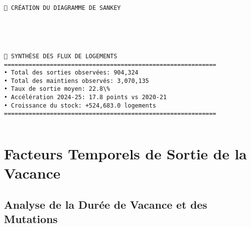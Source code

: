 \documentclass[11pt]{article}
\makeatletter
\newcommand{\boxspacing}{\kern\kvtcb@left@rule\kern\kvtcb@boxsep}
\newcommand{\prompt}[4]{
        {\ttfamily\llap{{\color{#2}[#3]:\hspace{3pt}#4}}\vspace{-\baselineskip}}
    }
\makeatother
\begin{document}
    \begin{Verbatim}[commandchars=\\\{\}]
🌊 CRÉATION DU DIAGRAMME DE SANKEY
    \end{Verbatim}

    \begin{center}
    \end{center}
    { \hspace*{\fill} \\}
    
    \begin{center}
    \end{center}
    { \hspace*{\fill} \\}
    
    \begin{Verbatim}[commandchars=\\\{\}]
🌊 SYNTHÈSE DES FLUX DE LOGEMENTS
============================================================
• Total des sorties observées: 904,324
• Total des maintiens observés: 3,070,135
• Taux de sortie moyen: 22.8\%
• Accélération 2024-25: 17.8 points vs 2020-21
• Croissance du stock: +524,683.0 logements
============================================================
    \end{Verbatim}

    \begin{tcolorbox}[breakable, size=fbox, boxrule=1pt, pad at break*=1mm,colback=cellbackground, colframe=cellborder]
\prompt{In}{incolor}{ }{\boxspacing}
\begin{Verbatim}[commandchars=\\\{\}]

\end{Verbatim}
\end{tcolorbox}

    \section{Facteurs Temporels de Sortie de la
Vacance}\label{facteurs-temporels-de-sortie-de-la-vacance}

\subsection{Analyse de la Durée de Vacance et des
Mutations}\label{analyse-de-la-duruxe9e-de-vacance-et-des-mutations}
\end{document}
